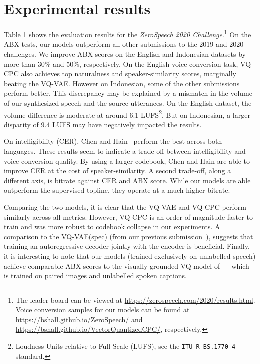 \documentclass[a4paper]{article}
\begin{document}
\section{Experimental results}
\label{sec:experiments}

Table 1 shows the evaluation results for the \textit{ZeroSpeech 2020 Challenge}.\footnote{The leader-board can be viewed at {\scriptsize \url{https://zerospeech.com/2020/results.html}}. Voice conversion samples for our models can be found at {\scriptsize \url{https://bshall.github.io/ZeroSpeech/}} and {\scriptsize \url{https://bshall.github.io/VectorQuantizedCPC/}}, respectively.}
On the ABX tests, our models outperform all other submissions to the 2019 and 2020 challenges.
We improve ABX scores on the English and Indonesian datasets by more than 30\% and 50\%, respectively.
On the English voice conversion task, VQ-CPC also achieves top naturalness and speaker-similarity scores, marginally beating the VQ-VAE. 
However on Indonesian, some of the other submissions perform better.
This discrepancy may be explained by a mismatch in the volume of our synthesized speech and the source utterances. On the English dataset, the volume difference is moderate at around 6.1 LUFS\footnote{Loudness Units relative to Full Scale (LUFS), see the \texttt{ITU-R BS.1770-4} standard.}. But on Indonesian, a larger disparity of 9.4 LUFS may have negatively impacted the results.

On intelligibility (CER), Chen and Hain~\cite{chen+hain_interspeech20} perform the best across both languages.
These results seem to indicate a trade-off between intelligibility and voice conversion quality. 
By using a larger codebook, Chen and Hain are able to improve CER at the cost of speaker-similarity.
A second trade-off, along a different axis, is bitrate against CER and ABX score.
While our models are able outperform the supervised topline, they operate at a much higher bitrate.

Comparing the two models, it is clear that the VQ-VAE and VQ-CPC perform similarly across all metrics.
However, VQ-CPC is an order of magnitude faster to train and was more robust to codebook collapse in our experiments.
A comparison to the VQ-VAE(spec) (from our previous submission~\cite{eloff+etal_interspeech19}), suggests that training an autoregressive decoder jointly with the encoder is beneficial.
Finally, it is interesting to note that our models (trained exclusively on unlabelled speech) achieve comparable ABX scores to the visually grounded VQ model of~\cite{harwath+etal_iclr20} -- which is trained on paired images and unlabelled spoken captions.
\end{document}

